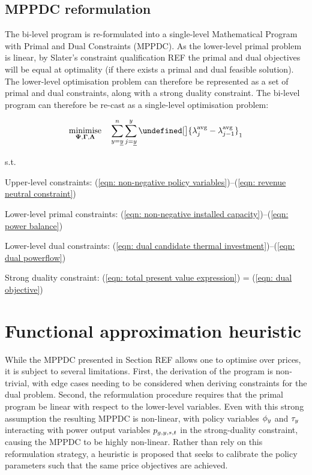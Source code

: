 \documentclass{article}
\let\norm\undefined %
\DeclarePairedDelimiter\norm{\lVert}{\rVert}
\DeclareMathOperator*{\minimise}{minimise}
\begin{document}
 
\subsection{MPPDC reformulation}
The bi-level program is re-formulated into a single-level Mathematical Program with Primal and Dual Constraints (MPPDC). As the lower-level primal problem is linear, by Slater's constraint qualification REF the primal and dual objectives will be equal at optimality (if there exists a primal and dual feasible solution). The lower-level optimisation problem can therefore be represented as a set of primal and dual constraints, along with a strong duality constraint. The bi-level program can therefore be re-cast as a single-level optimisation problem:

\begin{equation}
\minimise\limits_{\bm{\Psi}, \bm{\Gamma}, \bm{\Lambda}} \quad \sum\limits_{\iYear=\iYearStart}^{\iYearTransition} \sum\limits_{\iYearAlias=\iYearStart}^{\iYear} \norm[\big]{\dAveragePrice[\iYearAlias] - \dAveragePrice[\iYearAlias-1]}_{1} \nonumber
\end{equation}

s.t.

Upper-level constraints:
(\ref{eqn: non-negative policy variables})--(\ref{eqn: revenue neutral constraint})

Lower-level primal constraints:
(\ref{eqn: non-negative installed capacity})--(\ref{eqn: power balance})

Lower-level dual constraints:
(\ref{eqn: dual candidate thermal investment})--(\ref{eqn: dual powerflow})

Strong duality constraint:
(\ref{eqn: total present value expression}) = (\ref{eqn: dual objective})
 
\section{Functional approximation heuristic}
While the MPPDC presented in Section REF allows one to optimise over prices, it is subject to several limitations. First, the derivation of the program is non-trivial, with edge cases needing to be considered when deriving constraints for the dual problem. Second, the reformulation procedure requires that the primal program be linear with respect to the lower-level variables. Even with this strong assumption the resulting MPPDC is non-linear, with policy variables $\phi_{y}$ and $\tau_{y}$ interacting with power output variables $p_{g,y,s,t}$ in the strong-duality constraint, causing the MPPDC to be highly non-linear. Rather than rely on this reformulation strategy, a heuristic is proposed that seeks to calibrate the policy parameters such that the same price objectives are achieved. 
\end{document}
